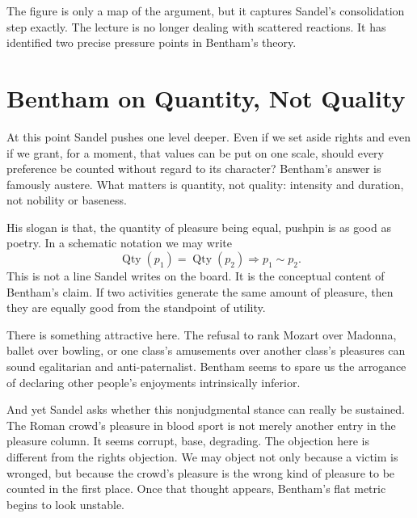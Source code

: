 \begin{figure}
\centering
{}
\end{figure}

The figure is only a map of the argument, but it captures Sandel's consolidation step exactly. The lecture is no longer dealing with scattered reactions. It has identified two precise pressure points in Bentham's theory.

\section{Bentham on Quantity, Not Quality}

At this point Sandel pushes one level deeper. Even if we set aside rights and even if we grant, for a moment, that values can be put on one scale, should every preference be counted without regard to its character? Bentham's answer is famously austere. What matters is quantity, not quality: intensity and duration, not nobility or baseness.

His slogan is that, the quantity of pleasure being equal, pushpin is as good as poetry. In a schematic notation we may write
\begin{equation}
\operatorname{Qty}(p_1)=\operatorname{Qty}(p_2)\Longrightarrow p_1\sim p_2.
\end{equation}
This is not a line Sandel writes on the board. It is the conceptual content of Bentham's claim. If two activities generate the same amount of pleasure, then they are equally good from the standpoint of utility.

There is something attractive here. The refusal to rank Mozart over Madonna, ballet over bowling, or one class's amusements over another class's pleasures can sound egalitarian and anti-paternalist. Bentham seems to spare us the arrogance of declaring other people's enjoyments intrinsically inferior.

And yet Sandel asks whether this nonjudgmental stance can really be sustained. The Roman crowd's pleasure in blood sport is not merely another entry in the pleasure column. It seems corrupt, base, degrading. The objection here is different from the rights objection. We may object not only because a victim is wronged, but because the crowd's pleasure is the wrong kind of pleasure to be counted in the first place. Once that thought appears, Bentham's flat metric begins to look unstable.

